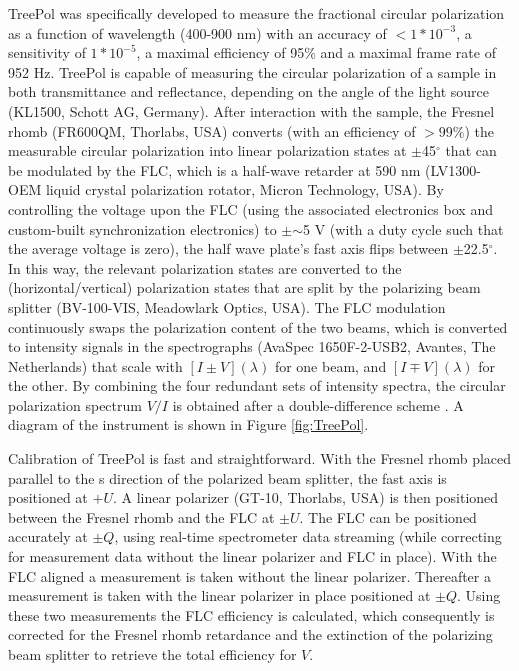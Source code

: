 \documentclass[review]{elsarticle}
\begin{document}
TreePol was specifically developed to measure the fractional circular polarization as a function of wavelength (400-900 nm) with an accuracy of $<1*10^{-3}$, a sensitivity of $1*10^{-5}$, a maximal efficiency of 95\% and a maximal frame rate of 952 Hz. TreePol is capable of measuring the circular polarization of a sample in both transmittance and reflectance, depending on the angle of the light source (KL1500, Schott AG, Germany). After interaction with the sample, the Fresnel rhomb (FR600QM, Thorlabs, USA) converts (with an efficiency of $>99\%$) the measurable circular polarization into linear polarization states at $\pm$45$^\circ$ that can be modulated by the FLC, which is a half-wave retarder at 590 nm (LV1300-OEM liquid crystal polarization rotator, Micron Technology, USA). By controlling the voltage upon the FLC (using the associated electronics box and custom-built synchronization electronics) to $\pm$$\sim$5 V (with a duty cycle such that the average voltage is zero), the half wave plate's fast axis flips between $\pm$22.5$^\circ$. In this way, the relevant polarization states are converted to the (horizontal/vertical) polarization states that are split by the polarizing beam splitter (BV-100-VIS, Meadowlark Optics, USA). The FLC modulation continuously swaps the polarization content of the two beams, which is converted to intensity signals in the spectrographs (AvaSpec 1650F-2-USB2, Avantes, The Netherlands) that scale with $[I\pm V](\lambda)$ for one beam, and $[I\mp V](\lambda)$ for the other. By combining the four redundant sets of intensity spectra, the circular polarization spectrum $V/I$ is obtained after a double-difference scheme \cite{Snik2013}. A diagram of the instrument is shown in Figure \ref{fig:TreePol}.

Calibration of TreePol is fast and straightforward. With the Fresnel rhomb placed parallel to the s direction of the polarized beam splitter, the fast axis is positioned at $+U$. A linear polarizer (GT-10, Thorlabs, USA) is then positioned between the Fresnel rhomb and the FLC at $\pm U$. The FLC can be positioned accurately at $\pm Q$, using real-time spectrometer data streaming (while correcting for measurement data without the linear polarizer and FLC in place). With the FLC aligned a measurement is taken without the linear polarizer. Thereafter a measurement is taken with the linear polarizer in place positioned at $\pm Q$. Using these two measurements the FLC efficiency is calculated, which consequently is corrected for the Fresnel rhomb retardance and the extinction of the polarizing beam splitter to retrieve the total efficiency for $V$.
\end{document}
